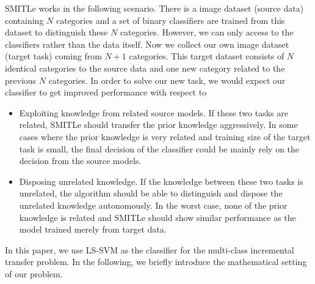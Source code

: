 SMITLe works in the following scenario. There is a image dataset (source data) containing $N$ categories and a set of binary classifiers are trained from this dataset to distinguish these $N$ categories. However, we can only access to the classifiers rather than the data itself. Now we collect our own image dataset (target task) coming from $N+1$ categories. This target dataset consists of $N$ identical categories to the source data and one new category related to the previous $N$ categories. In order to solve our new task, we would expect our classifier to get improved performance with respect to 
\begin{itemize}
\item Exploiting knowledge from related source models. If these two tasks are related, SMITLe should transfer the prior knowledge aggressively. In some cases where the prior knowledge is very related and training size of the target task is small, the final decision of the classifier could be mainly rely on the decision from the source models.
\item Disposing unrelated knowledge. If the knowledge between these two tasks is unrelated, the algorithm should be able to distinguish and dispose the unrelated knowledge autonomously. In the worst case, none of the prior knowledge is related and SMITLe should show similar performance as the model trained merely from target data.
\end{itemize}

In this paper, we use LS-SVM as the classifier for the multi-class incremental transfer problem. In the following, we briefly introduce the mathematical setting of our problem.

